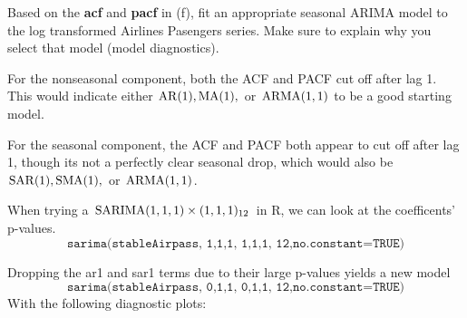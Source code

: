 Based on the \textbf{acf} and \textbf{pacf} in (f), fit an appropriate seasonal ARIMA model to the log transformed Airlines Pasengers series. Make sure to explain why you select that model (model diagnostics).

\nl For the nonseasonal component, both the ACF and PACF cut off after lag 1. This would indicate either $\operatorname{AR}(1), \operatorname{MA}(1),$ or $\operatorname{ARMA}(1,1)$ to be a good starting model. 

\nl For the seasonal component, the ACF and PACF both appear to cut off after lag 1, though its not a perfectly clear seasonal drop, which would also be $\operatorname{SAR}(1), \operatorname{SMA}(1),$ or $\operatorname{ARMA}(1,1)$.

\nl When trying a $\operatorname{SARIMA}(1,1,1) \times (1,1,1)_{12}$ in R, we can look at the coefficents' p-values.
$$\texttt{sarima(stableAirpass, 1,1,1, 1,1,1, 12,no.constant=TRUE)}$$

\nl Dropping the ar1 and sar1 terms due to their large p-values yields a new model
$$\texttt{sarima(stableAirpass, 0,1,1, 0,1,1, 12,no.constant=TRUE)}$$
With the following diagnostic plots:


